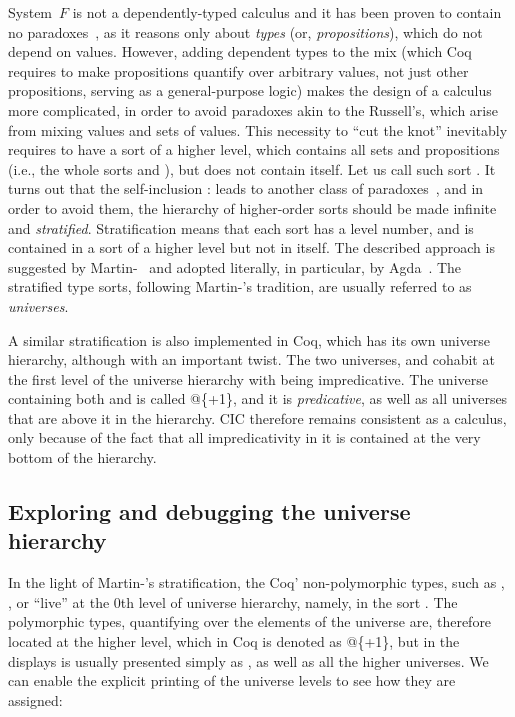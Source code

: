 System~$F$ is not a dependently-typed calculus and it has been
proven to contain no paradoxes~\cite{Girard:PhD}, as it reasons only
about \textit{types} (or, \textit{propositions}), which do not depend on
values. However, adding dependent types to the mix (which Coq requires
to make propositions quantify over arbitrary values, not just other
propositions, serving as a general-purpose logic) makes the design of
a calculus more complicated, in order to avoid paradoxes akin to the
Russell's, which arise from mixing values and sets of values. This
necessity to ``cut the knot'' inevitably requires to have a sort of a
higher level, which contains all sets and propositions (i.e., the
whole sorts  and ), but does not contain itself. Let us
call such sort . It turns out that the self-inclusion  :
 leads to another class of paradoxes~\cite{Coquand:LICS86}, and
in order to avoid them, the hierarchy of higher-order sorts should be
made infinite and \textit{stratified}. 
Stratification means that each sort has a level number, and is
contained in a sort of a higher level but not in itself. The described
approach is suggested by Martin-\loef~\cite{Martin-Loef:84} and
adopted literally, in particular, by
Agda~\cite{Norell:PhD}. The stratified type sorts,
following Martin-\loef's tradition, are usually referred to as
\textit{universes}.


A similar stratification is also implemented in Coq, which has its own
universe hierarchy, although with an important twist. The two
universes,  and  cohabit at the first level of the universe
hierarchy with  being impredicative. The universe containing
both  and  is called @\{+1\}, and it is \textit{predicative}, as
well as all universes that are above it in the hierarchy. CIC
therefore remains consistent as a calculus, only because of the fact
that all impredicativity in it is contained at the very bottom of the
hierarchy.


\subsection{Exploring and debugging the universe hierarchy}




In the light of Martin-\loef's stratification, the Coq'
non-polymorphic types, such as , ,  or  
``live'' at the 0th level of universe hierarchy, namely, in the sort
. The polymorphic types, quantifying over the elements of the
 universe are, therefore located at the higher level, which in
Coq is denoted as @\{+1\}, but in the displays is usually presented
simply as , as well as all the higher universes. We can enable
the explicit printing of the universe levels to see how they are
assigned:



